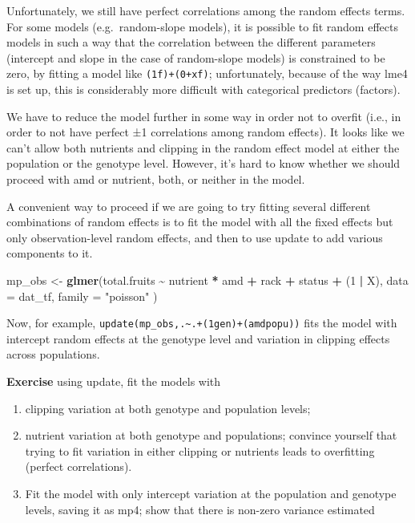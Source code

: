 \documentclass[
  12pt,
]{book}
\makeatletter
\newenvironment{Shaded}{\begin{snugshade}}{\end{snugshade}}
\newcommand{\DataTypeTok}[1]{\textcolor[rgb]{0.13,0.29,0.53}{#1}}
\newcommand{\DecValTok}[1]{\textcolor[rgb]{0.00,0.00,0.81}{#1}}
\newcommand{\KeywordTok}[1]{\textcolor[rgb]{0.13,0.29,0.53}{\textbf{#1}}}
\newcommand{\NormalTok}[1]{#1}
\newcommand{\OperatorTok}[1]{\textcolor[rgb]{0.81,0.36,0.00}{\textbf{#1}}}
\newcommand{\StringTok}[1]{\textcolor[rgb]{0.31,0.60,0.02}{#1}}
\providecommand{\tightlist}{%
  \setlength{\itemsep}{0pt}\setlength{\parskip}{0pt}}
\newenvironment{kframe}{%
\medskip{}
\setlength{\fboxsep}{.8em}
\def\at@end@of@kframe{}%
\ifinner\ifhmode%
 \def\at@end@of@kframe{\end{minipage}}%
 \begin{minipage}{\columnwidth}%
\fi\fi%
\def\FrameCommand##1{\hskip\@totalleftmargin \hskip-\fboxsep
\colorbox{incolor}{##1}\hskip-\fboxsep
    \hskip-\linewidth \hskip-\@totalleftmargin \hskip\columnwidth}%
\MakeFramed {\advance\hsize-\width
  \@totalleftmargin\z@ \linewidth\hsize
  \@setminipage}}%
{\par\unskip\endMakeFramed%
\at@end@of@kframe}
\newenvironment{rmdblock}[1]
 {
 \begin{itemize}
 \renewcommand{\labelitemi}{
   \raisebox{-.7\height}[0pt][0pt]{
     {\setkeys{Gin}{width=3em,keepaspectratio}\texttt{[image: images/icons/\#1]}}
   }
 }
 \begin{kframe}
 \setlength{\fboxsep}{1em}
 \item
 }
 {
 \end{kframe}
 \end{itemize}
 }
\newenvironment{rmdcode}
  {\begin{rmdblock}{code}}
  {\end{rmdblock}}
\makeatother
\begin{document}
Unfortunately, we still have perfect correlations among the random effects terms. For some models (e.g.~random-slope models), it is possible to fit random effects models in such a way that the correlation between the different parameters (intercept and slope in the case of random-slope models) is constrained to be zero, by fitting a model like \texttt{(1\textbar{}f)+(0+x\textbar{}f)}; unfortunately, because of the way lme4 is set up, this is considerably more difficult with categorical predictors (factors).

We have to reduce the model further in some way in order not to overfit (i.e., in order to not have perfect ±1 correlations among random effects). It looks like we can't allow both nutrients and clipping in the random effect model at either the population or the genotype level. However, it's hard to know whether we should proceed with amd or nutrient, both, or neither in the model.

A convenient way to proceed if we are going to try fitting several different combinations of random effects is to fit the model with all the fixed effects but only observation-level random effects, and then to use update to add various components to it.

\begin{Shaded}
\begin{Highlighting}[]
\NormalTok{mp\_obs \textless{}{-}}\StringTok{ }\KeywordTok{glmer}\NormalTok{(total.fruits }\OperatorTok{\textasciitilde{}}\StringTok{ }\NormalTok{nutrient }\OperatorTok{*}\StringTok{ }\NormalTok{amd }\OperatorTok{+}
\StringTok{  }\NormalTok{rack }\OperatorTok{+}\StringTok{ }\NormalTok{status }\OperatorTok{+}
\StringTok{  }\NormalTok{(}\DecValTok{1} \OperatorTok{|}\StringTok{ }\NormalTok{X),}
\DataTypeTok{data =}\NormalTok{ dat\_tf, }\DataTypeTok{family =} \StringTok{"poisson"}
\NormalTok{)}
\end{Highlighting}
\end{Shaded}

Now, for example, \texttt{update(mp\_obs,.\textasciitilde{}.+(1\textbar{}gen)+(amd\textbar{}popu))} fits the model with intercept random effects at the genotype level and variation in clipping effects across populations.

\begin{rmdcode}
\textbf{Exercise} using update, fit the models with

\begin{enumerate}
\def\labelenumi{\arabic{enumi}.}
\tightlist
\item
  clipping variation at both genotype and population levels;
\item
  nutrient variation at both genotype and populations; convince yourself that trying to fit variation in either clipping or nutrients leads to overfitting (perfect correlations).
\item
  Fit the model with only intercept variation at the population and genotype levels, saving it as mp4; show that there is non-zero variance estimated
\end{enumerate}
\end{rmdcode}
\end{document}
